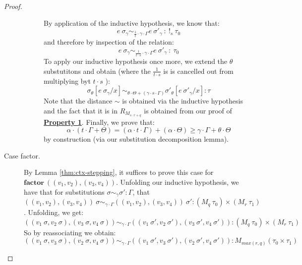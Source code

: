 \begin{proof}
\begin{description}
\begin{description}
          By application of the inductive hypothesis, we know that:
          $$
          e~\sigma_{\gamma} \sim_{\frac{1}{t} \cdot \gamma \cdot \Gamma}
          e~\sigma'_{\gamma} \ : \> !_{s}~\tau_0
          $$
          and therefore by inspection of the relation:
          $$
          e~\sigma_{\gamma} \sim_{\frac{1}{t \cdot s} \cdot \gamma \cdot \Gamma}
          e~\sigma'_{\gamma} \ : \> \tau_0
          $$
          To apply our inductive hypothesis once more, we extend the $\theta$
          substutitons and obtain (where the $\frac{1}{t \cdot s}$ is is
          cancelled out from multiplying byt $t \cdot s$ ):
          $$\sigma_{\theta}[e~\sigma_{\gamma}/x] \sim_{\theta \cdot \Theta + (\gamma \cdot s \cdot \Gamma)}\sigma'_{\theta}[e~\sigma'_{\gamma}/x] : \tau$$
          Note that the distance $\sim$ is obtained via the inductive hypothesis
          and the fact that it is in $R_{M_{s \cdot r + q}}$ is obtained from
          our proof of \textbf{\underline{Property 1}}.
          Finally, we prove that:
          $$
          \alpha \cdot (t \cdot \Gamma + \Theta) = 
          (\alpha \cdot t \cdot \Gamma) + (\alpha \cdot \Theta)
          \geq
          \gamma \cdot \Gamma + \theta \cdot \Theta
          $$
          by construction (via our substitution decomposition lemma).
      \end{description}

    \item[Case factor.] 
      By Lemma \ref{thm:ctx-stepping}, it suffices to prove this case for 
      $\mathbf{factor}~((v_1, v_2), (v_3, v_4))$. 
      Unfolding our inductive hypothesis, we have that for substitutions
      $\sigma \sim_{\gamma} \sigma' : \Gamma$, that 
      $((v_1, v_2), (v_3, v_4))~\sigma \sim_{\gamma \cdot \Gamma} ((v_1, v_2),
      (v_3, v_4))~\sigma' : (M_q~\tau_0) \times (M_r~\tau_1)$.
      Unfolding, we get:
      $$
      ((v_1~\sigma, v_2~\sigma), (v_3~\sigma, v_4~\sigma)) \sim_{\gamma \cdot \Gamma} ((v_1~\sigma', v_2~\sigma'),
      (v_3~\sigma', v_4~\sigma')) : (M_q~\tau_0) \times (M_r~\tau_1)
      $$
      So by reassociating we obtain:
      $$
      ((v_1~\sigma, v_3~\sigma), (v_2~\sigma, v_4~\sigma)) \sim_{\gamma \cdot \Gamma} ((v_1~\sigma', v_3~\sigma'),
      (v_2~\sigma', v_4~\sigma')) : M_{max(r,q)}(\tau_0 \times \tau_1)
      $$


\end{description}
\end{proof}
